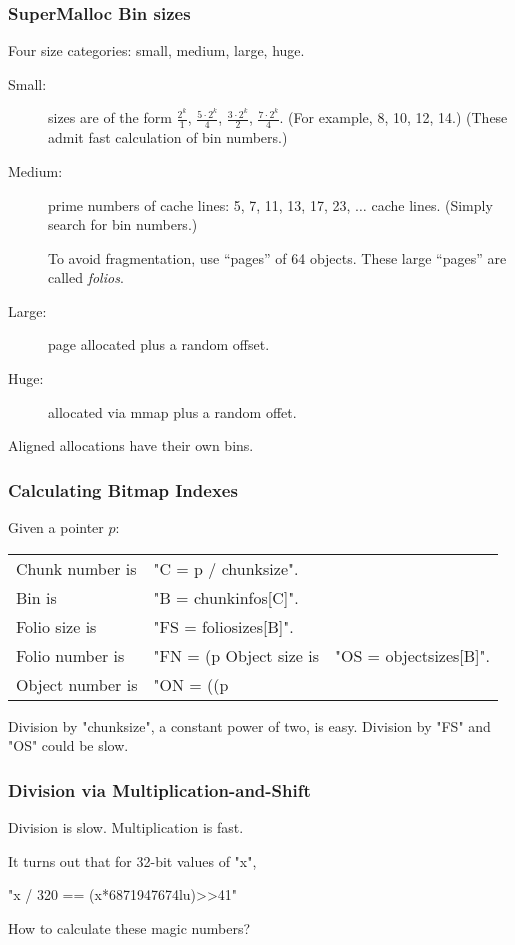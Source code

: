 \documentclass[xcolor=dvipsnames,14pt]{beamer}
\begin{document}
\begin{frame}
\frametitle{SuperMalloc Bin sizes}

Four size categories: small, medium, large, huge.

\begin{description}
\item[Small:] sizes are of the form $\frac{2^k}{1}$, $\frac{5 \cdot 2^k}{4}$, $\frac{3 \cdot 2^k}{2}$, $\frac{7 \cdot 2^k}{4}$.  
(For example, 8, 10, 12, 14.)  (These admit fast calculation of bin numbers.)

\item[Medium:] prime numbers of cache lines: 5, 7, 11, 13, 17, 23,
  $\ldots$ cache lines.  (Simply search for bin numbers.)

 To avoid fragmentation, use ``pages'' of 64 objects.  These large
 ``pages'' are called \textit{folios}.

\item[Large:] page allocated plus a random offset.

\item[Huge:] allocated via mmap plus a random offet.
\end{description}

Aligned allocations have their own bins.

\end{frame}

\begin{frame}[fragile]
\frametitle{Calculating Bitmap Indexes}

Given a pointer $p$:

\begin{tabular}{ll}
 Chunk number is & "C = p / chunksize". \\
 Bin is          & "B = chunkinfos[C]".  \\
 Folio size is   & "FS = foliosizes[B]". \\
 Folio number is & "FN = (p%
 Object size is  & "OS = objectsizes[B]". \\
 Object number is& "ON = ((p%
\end{tabular}

Division by "chunksize", a constant power of two, is
easy.  Division by "FS" and "OS" could be
slow.

\end{frame}

\begin{frame}[fragile]
\frametitle{Division via Multiplication-and-Shift}

Division is slow.  Multiplication is fast.

It turns out that for 32-bit values of "x",
\begin{center}
"x / 320 == (x*6871947674lu)>>41"
\end{center}

How to calculate these magic numbers? 
\end{frame}
\end{document}
